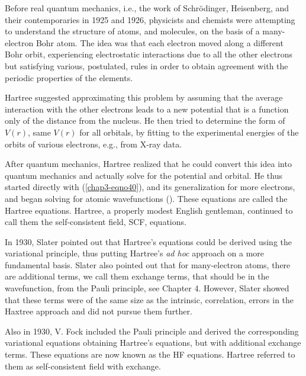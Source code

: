 Before real quantum mechanics, i.e., the work of Schr\"odinger, Heisenberg, 
and their contemporaries in 1925 and 1926, physicists and chemists were 
attempting to understand the structure of atoms, and molecules, on the basis 
of a many-electron Bohr atom.  The idea was that each electron moved along 
a different Bohr orbit, experiencing electrostatic interactions due to all 
the other electrons but satisfying various, postulated, rules in order to 
obtain agreement with the periodic properties of the elements.

Hartree suggested \cite{chap3-ref8} approximating this problem by
assuming that the average interaction with the other electrons leads
to a new potential that is a function only of the distance from the
nucleus.  He then tried to determine the form of $V(r)$, same $V(r)$
for all orbitals, by fitting to the experimental energies of the
orbits of various electrons, e.g., from X-ray data.

After quantum mechanics, Hartree realized that he could convert this
idea into quantum mechanics and actually solve for the potential and
orbital.  He thus started directly with (\ref{chap3-eqno40}), and its
generalization for more electrons, and began solving for atomic
wavefunctions (\cite{chap3-ref9}). These equations are called the
Hartree equations.  Hartree, a properly modest English gentleman,
continued to call them the self-consistent field, SCF, equations.

In 1930, Slater pointed out \cite{chap3-ref10} that Hartree's equations
could be derived using the variational principle, thus putting
Hartree's {\it ad hoc} approach on a more fundamental basis.  Slater
also pointed out that for many-electron atoms, there are additional
terms, we call them exchange terms, that should be in the
wavefunction, from the Pauli principle, see Chapter 4.  However,
Slater showed that these terms were of the same size as the intrinsic,
correlation, errors in the Haxtree approach and did not pursue them
further.

Also in 1930, V. Fock \cite{chap3-ref11} included the Pauli principle
and derived the corresponding variational equations obtaining
Hartree's equations, but with additional exchange terms. These
equations are now known as the HF equations.  Hartree referred to them
as self-consistent field with exchange.

